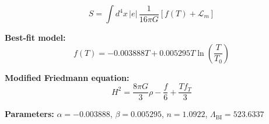 
\begin{equation}
  S = \int d^4x \, |e| \, \frac{1}{16\pi G} \left[ f(T) + \mathcal{L}_m \right]
\end{equation}

\textbf{Best-fit model:}
\begin{equation}
  f(T) = -0.003888 T + 0.005295 T \ln\!\left(\frac{T}{T_0}\right)
\end{equation}

\textbf{Modified Friedmann equation:}
\begin{equation}
  H^2 = \frac{8\pi G}{3} \rho - \frac{f}{6} + \frac{T f_T}{3}
\end{equation}

\textbf{Parameters:}
$\alpha = -0.003888$, \quad
$\beta = 0.005295$, \quad
$n = 1.0922$, \quad
$\Lambda_{\text{BI}} = 523.6337$
